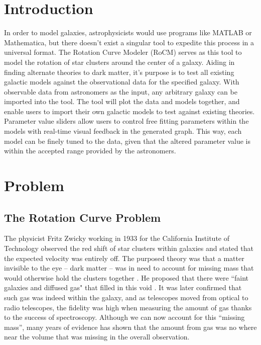 \documentclass[conference]{IEEEtran}
\begin{document}
\section{Introduction}
In order to model galaxies, astrophysicists would use programs like MATLAB or Mathematica, but there doesn't exist a singular tool to expedite this process in a universal format. The Rotation Curve Modeler (RoCM) serves as this tool to model the rotation of star clusters around the center of a galaxy. Aiding in finding alternate theories to dark matter, it's purpose is to test all existing galactic models against the observational data for the specified galaxy. With observable data from astronomers as the input, any arbitrary galaxy can be imported into the tool. The tool will plot the data and models together, and enable users to import their own galactic models to test against existing theories. Parameter value sliders allow users to control free fitting parameters within the models with real-time visual feedback in the generated graph. This way, each model can be finely tuned to the data, given that the altered parameter value is within the accepted range provided by the astronomers.


\section{Problem}

\subsection{The Rotation Curve Problem}
The physicist Fritz Zwicky working in 1933 for the California Institute of Technology observed the red shift of star clusters within galaxies and stated that the expected velocity was entirely off. The purposed theory was that a matter invisible to the eye -- dark matter -- was in need to account for missing mass that would otherwise hold the clusters together \cite{zwicky}. He proposed that there were ``faint galaxies and diffused gas" that filled in this void \cite{zwicky}. It was later confirmed that such gas was indeed within the galaxy, and as telescopes moved from optical to radio telescopes, the fidelity was high when measuring the amount of gas thanks to the success of spectroscopy.  Although we can now account for this ``missing mass'', many years of evidence has shown that the amount from gas was no where near the volume that was missing in the overall observation. 
\end{document}
